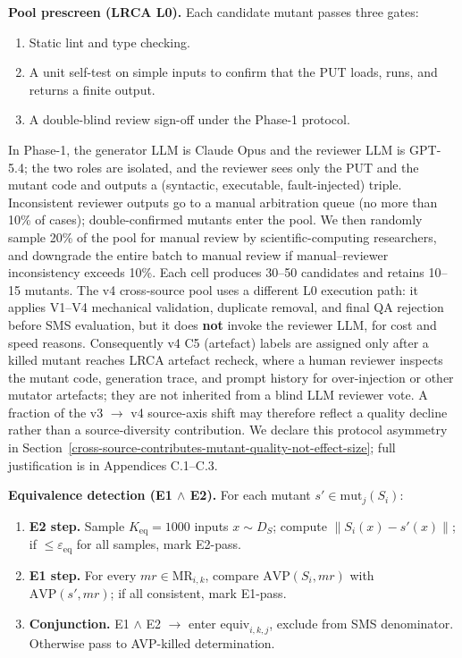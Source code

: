 \documentclass[manuscript,screen,review]{acmart}
\begin{document}
\textbf{Pool prescreen (LRCA L0).} Each candidate mutant passes three
gates:
\begin{enumerate}

\item Static lint and type checking.
\item A unit self-test on simple inputs to confirm that the PUT loads,
  runs, and returns a finite output.
\item A double-blind review sign-off under the Phase-1 protocol.
\end{enumerate} In Phase-1, the generator LLM is Claude Opus and the reviewer
LLM is GPT-5.4; the two roles are isolated, and the reviewer sees only
the PUT and the mutant code and outputs a (syntactic, executable,
fault-injected) triple. Inconsistent reviewer outputs go to a manual
arbitration queue (no more than 10\% of cases); double-confirmed mutants
enter the pool. We then randomly sample 20\% of the pool for manual
review by scientific-computing researchers, and downgrade the entire
batch to manual review if manual--reviewer inconsistency exceeds 10\%.
Each cell produces 30--50 candidates and retains 10--15 mutants. The v4
cross-source pool uses a different L0 execution path: it applies V1--V4
mechanical validation, duplicate removal, and final QA rejection before
SMS evaluation, but it does \textbf{not} invoke the reviewer LLM, for
cost and speed reasons. Consequently v4 C5 (artefact) labels are
assigned only after a killed mutant reaches LRCA artefact recheck, where
a human reviewer inspects the mutant code, generation trace, and prompt
history for over-injection or other mutator artefacts; they are not
inherited from a blind LLM reviewer vote. A fraction of the v3 $\to$ v4
source-axis shift may therefore reflect a quality decline rather than a
source-diversity contribution. We declare this protocol asymmetry in
Section~\ref{cross-source-contributes-mutant-quality-not-effect-size};
full justification is in Appendices C.1--C.3.

\textbf{Equivalence detection (E1 $\wedge$ E2).} For each mutant
$s' \in \mathrm{mut}_j(S_i)$:

\begin{enumerate}

\item
  \textbf{E2 step.} Sample $K_{\mathrm{eq}} = 1000$ inputs
  $x \sim D_S$; compute
  $\|S_i(x) - s'(x)\|$; if $\leq \varepsilon_{\mathrm{eq}}$ for all
  samples, mark E2-pass.
\item
  \textbf{E1 step.} For every $mr \in \mathrm{MR}_{i,k}$, compare
  $\mathrm{AVP}(S_i, mr)$ with $\mathrm{AVP}(s', mr)$;
  if all consistent, mark E1-pass.
\item
  \textbf{Conjunction.} E1 $\wedge$ E2 $\to$ enter $\mathrm{equiv}_{i,k,j}$,
  exclude from SMS denominator. Otherwise pass to AVP-killed
  determination.
\end{enumerate}
\end{document}
